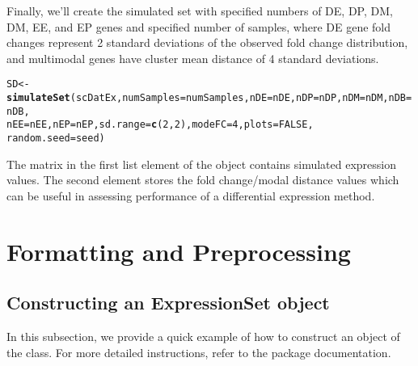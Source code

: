 \documentclass{article}\usepackage[]{graphicx}\usepackage[]{color}
\makeatletter
\newcommand{\hlnum}[1]{\textcolor[rgb]{0.686,0.059,0.569}{#1}}%
\newcommand{\hlstd}[1]{\textcolor[rgb]{0.345,0.345,0.345}{#1}}%
\newcommand{\hlkwb}[1]{\textcolor[rgb]{0.69,0.353,0.396}{#1}}%
\newcommand{\hlkwc}[1]{\textcolor[rgb]{0.333,0.667,0.333}{#1}}%
\newcommand{\hlkwd}[1]{\textcolor[rgb]{0.737,0.353,0.396}{\textbf{#1}}}%
\newenvironment{kframe}{%
 \def\at@end@of@kframe{}%
 \ifinner\ifhmode%
  \def\at@end@of@kframe{\end{minipage}}%
  \begin{minipage}{\columnwidth}%
 \fi\fi%
 \def\FrameCommand##1{\hskip\@totalleftmargin \hskip-\fboxsep
 \colorbox{shadecolor}{##1}\hskip-\fboxsep
     \hskip-\linewidth \hskip-\@totalleftmargin \hskip\columnwidth}%
 \MakeFramed {\advance\hsize-\width
   \@totalleftmargin\z@ \linewidth\hsize
   \@setminipage}}%
 {\par\unskip\endMakeFramed%
 \at@end@of@kframe}
\newenvironment{knitrout}{}{} %
\makeatother
\begin{document}
Finally, we'll create the simulated set with specified numbers of DE, DP, DM, DM, EE, and EP genes and specified number of samples, where DE gene fold changes represent 2 standard deviations of the observed fold change distribution, and multimodal genes have cluster mean distance of 4 standard deviations.
\begin{knitrout}
\color{fgcolor}\begin{kframe}
\begin{alltt}
\hlstd{SD} \hlkwb{<-} \hlkwd{simulateSet}\hlstd{(scDatEx,} \hlkwc{numSamples}\hlstd{=numSamples,} \hlkwc{nDE}\hlstd{=nDE,} \hlkwc{nDP}\hlstd{=nDP,} \hlkwc{nDM}\hlstd{=nDM,} \hlkwc{nDB}\hlstd{=nDB,}
                  \hlkwc{nEE}\hlstd{=nEE,} \hlkwc{nEP}\hlstd{=nEP,} \hlkwc{sd.range}\hlstd{=}\hlkwd{c}\hlstd{(}\hlnum{2}\hlstd{,}\hlnum{2}\hlstd{),} \hlkwc{modeFC}\hlstd{=}\hlnum{4}\hlstd{,} \hlkwc{plots}\hlstd{=}\hlnum{FALSE}\hlstd{,}
                  \hlkwc{random.seed}\hlstd{=seed)}
\end{alltt}


{\ttfamily\noindent\itshape\color{messagecolor}{\#\# Identifying a set of genes to simulate from...}}

{\ttfamily\noindent\itshape\color{messagecolor}{\#\# Simulating DE fold changes...}}

{\ttfamily\noindent\itshape\color{messagecolor}{\#\# Simulating individual genes...}}

{\ttfamily\noindent\itshape\color{messagecolor}{\#\# Done! Simulated 5 DE, 5 DP, 5 DM, 5 DB, 5 EE, and 5 EP genes}}\end{kframe}
\end{knitrout}

The matrix in the first list element of the  object contains simulated expression values.  The second element stores the fold change/modal distance values which can be useful in assessing performance of a differential expression method.

\section{Formatting and Preprocessing}
\subsection{Constructing an ExpressionSet object}

In this subsection, we provide a quick example of how to construct an object of the  class.  For more detailed instructions, refer to the  package documentation.
\end{document}
